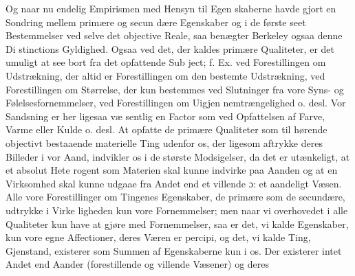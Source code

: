 \documentclass[12pt,a4paper]{book}
\begin{document}
Og naar nu endelig Empirismen med Hensyn til Egen\-%
skaberne havde gjort en Sondring mellem primære og secun\-%
dære Egenskaber og i de første seet Bestemmelser ved selve
det objective Reale, saa benægter Berkeley ogsaa denne Di\-%
stinctions Gyldighed. Ogsaa ved det, der kaldes primære
Qualiteter, er det umuligt at see bort fra det opfattende Sub\-%
ject; f. Ex. ved Forestillingen om Udstrækning, der altid er
Forestillingen om den bestemte Udstrækning, ved Forestillingen
om Størrelse, der kun bestemmes ved Slutninger fra vore
Syns- og Følelsesfornemmelser, ved Forestillingen om Uigjen\-%
nemtrængelighed o. desl. Vor Sandsning er her ligesaa væ\-%
sentlig en Factor som ved Opfattelsen af Farve, Varme eller
Kulde o. desl. At opfatte de primære Qualiteter som til\-%
hørende objectivt bestaaende materielle Ting udenfor os, der
ligesom aftrykke deres Billeder i vor Aand, indvikler os i de
største Modsigelser, da det er utænkeligt, at et absolut Hete\-%
rogent som Materien skal kunne indvirke paa Aanden og at
en Virksomhed skal kunne udgaae fra Andet end et villende
ɔ: et aandeligt Væsen. Alle vore Forestillinger om Tingenes
Egenskaber, de primære som de secundære, udtrykke i Virke\-%
ligheden kun vore Fornemmelser; men naar vi overhovedet i
alle Qualiteter kun have at gjøre med Fornemmelser, saa er
det, vi kalde Egenskaber, kun vore egne Affectioner, deres
Væren er percipi, og det, vi kalde Ting, Gjenstand, existerer
som Summen af Egenskaberne kun i os. Der existerer intet
Andet end Aander (forestillende og villende Væsener) og deres
\end{document}
